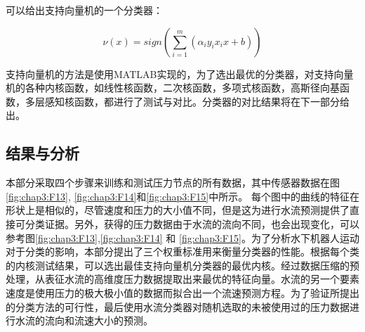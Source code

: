 可以给出支持向量机的一个分类器：

\begin{equation}
\nu \left( x \right) = sign\left( {\sum\limits_{i = 1}^m {\left( {{\alpha _i}{y_i}{x_i}x + b} \right)} } \right)
\label{eq:chap3:29}
\end{equation}

支持向量机的方法是使用MATLAB实现的，为了选出最优的分类器，对支持向量机的各种内核函数，如线性核函数，二次核函数，多项式核函数，高斯径向基函数，多层感知核函数，都进行了测试与对比。分类器的对比结果将在下一部分给出。

\subsection{结果与分析 }

本部分采取四个步骤来训练和测试压力节点的所有数据，其中传感器数据在图\ref{fig:chap3:F13}, \ref{fig:chap3:F14}和\ref{fig:chap3:F15}中所示。 每个图中的曲线的特征在形状上是相似的，尽管速度和压力的大小值不同，但是这为进行水流预测提供了直接可分类证据。另外，获得的压力数据由于水流的流向不同，也会出现变化，可以参考图\ref{fig:chap3:F13},\ref{fig:chap3:F14} 和 \ref{fig:chap3:F15}。为了分析水下机器人运动对于分类的影响，本部分提出了三个权重标准用来衡量分类器的性能。根据每个类的内核测试结果，可以选出最佳支持向量机分类器的最优内核。经过数据压缩的预处理，从表征水流的高维度压力数据提取出来最优的特征向量。水流的另一个要素速度是使用压力的极大极小值的数据而拟合出一个流速预测方程。为了验证所提出的分类方法的可行性，最后使用水流分类器对随机选取的未被使用过的压力数据进行水流的流向和流速大小的预测。

